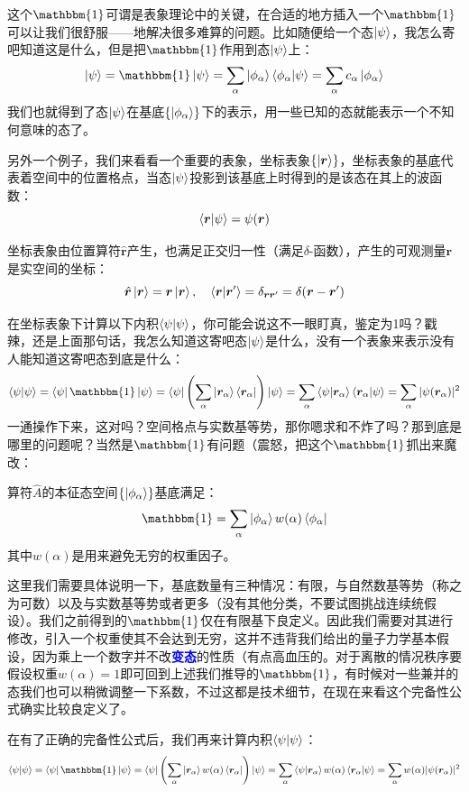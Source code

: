 这个$\mathbbm{1}$可谓是表象理论中的关键，在合适的地方插入一个$\mathbbm{1}$可以让我们很舒服——地解决很多难算的问题。比如随便给一个态$\ket{\psi}$，我怎么寄吧知道这是什么，但是把$\mathbbm{1}$作用到态$\ket{\psi}$上：
\[\ket{\psi}=\mathbbm{1}\ket{\psi}=\sum_{\alpha}\ket{\phi_{\alpha}}\bra{\phi_{\alpha}}\ket{\psi}=\sum_{\alpha}c_{\alpha}\ket{\phi_{\alpha}}\]
我们也就得到了态$\ket{\psi}$在基底$\{\ket{\phi_{\alpha}}\}$下的表示，用一些已知的态就能表示一个不知何意味的态了。

另外一个例子，我们来看看一个重要的表象，坐标表象$\{\ket{\bm{r}}\}$，坐标表象的基底代表着空间中的位置格点，当态$\ket{\psi}$投影到该基底上时得到的是该态在其上的波函数：
\[\bra{\bm{r}}\ket{\psi}=\psi(\bm{r})\]

坐标表象由位置算符$\hat{\bm{r}}$产生，也满足正交归一性（满足$\delta$-函数），产生的可观测量$\bm{r}$是实空间的坐标：
\[\hat{\bm{r}}\ket{\bm{r}}=\bm{r}\ket{\bm{r}}, \quad \bra{\bm{r}}\ket{\bm{r}'}=\delta_{\bm{r}\bm{r}'}=\delta(\bm{r}-\bm{r}')\]

在坐标表象下计算以下内积$\bra{\psi}\ket{\psi}$，你可能会说这不一眼盯真，鉴定为1吗？戳辣，还是上面那句话，我怎么知道这寄吧态$\ket{\psi}$是什么，没有一个表象来表示没有人能知道这寄吧态到底是什么：
\[\bra{\psi}\ket{\psi}=\bra{\psi}\mathbbm{1}\ket{\psi}=\bra{\psi}\left(\sum_{\alpha}\ket{\bm{r}_{\alpha}}\bra{\bm{r}_{\alpha}}\right)\ket{\psi}=\sum_{\alpha}\bra{\psi}\ket{\bm{r}_{\alpha}}\bra{\bm{r}_{\alpha}}\ket{\psi}=\sum_{\alpha}|\psi(\bm{r}_{\alpha})|^2\]
一通操作下来，这对吗？空间格点与实数基等势，那你嗯求和不炸了吗？那到底是哪里的问题呢？当然是$\mathbbm{1}$有问题（震怒，把这个$\mathbbm{1}$抓出来魔改：
\begin{theorem}[完备性公式]
算符$\hat{A}$的本征态空间$\{\ket{\phi_{\alpha}}\}$基底满足：
\[\mathbbm{1}=\sum_{\alpha}\ket{\phi_{\alpha}}w(\alpha)\bra{\phi_{\alpha}}\]
其中$w(\alpha)$是用来避免无穷的权重因子。
\end{theorem}

这里我们需要具体说明一下，基底数量有三种情况：有限，与自然数基等势（称之为可数）以及与实数基等势或者更多（没有其他分类，不要试图挑战连续统假设）。我们之前得到的$\mathbbm{1}$仅在有限基下良定义。因此我们需要对其进行修改，引入一个权重使其不会达到无穷，这并不违背我们给出的量子力学基本假设，因为乘上一个数字并不改\textcolor{blue}{\textbf{变态}}的性质（有点高血压的。对于离散的情况秩序要假设权重$w(\alpha)=1$即可回到上述我们推导的$\mathbbm{1}$，有时候对一些兼并的态我们也可以稍微调整一下系数，不过这都是技术细节，在现在来看这个完备性公式确实比较良定义了。

在有了正确的完备性公式后，我们再来计算内积$\bra{\psi}\ket{\psi}$：
\[\bra{\psi}\ket{\psi}=\bra{\psi}\mathbbm{1}\ket{\psi}=\bra{\psi}\left(\sum_{\alpha}\ket{\bm{r}_{\alpha}}w(\alpha)\bra{\bm{r}_{\alpha}}\right)\ket{\psi}=\sum_{\alpha}\bra{\psi}\ket{\bm{r}_{\alpha}}w(\alpha)\bra{\bm{r}_{\alpha}}\ket{\psi}=\sum_{\alpha}w(\alpha)|\psi(\bm{r}_{\alpha})|^2\]


